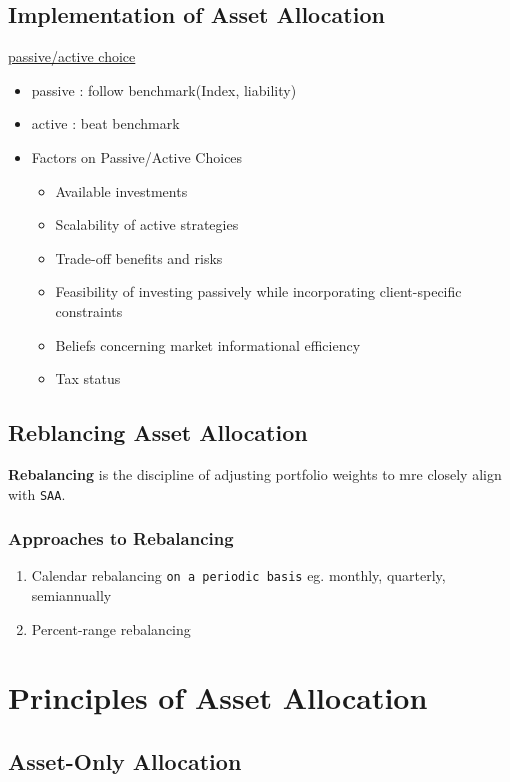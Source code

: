 \documentclass[12pt,a4paper]{article}
\begin{document}
\subsection{Implementation of Asset Allocation}
\label{sec:orgf552c2f}
\uline{passive/active choice}
\begin{itemize}
\item passive : follow benchmark(Index, liability)
\item active : beat benchmark

\item Factors on Passive/Active Choices
\begin{itemize}
\item Available investments
\item Scalability of active strategies
\item Trade-off benefits and risks
\item Feasibility of investing passively while incorporating client-specific constraints
\item Beliefs concerning market informational efficiency
\item Tax status
\end{itemize}
\end{itemize}
\subsection{Reblancing Asset Allocation}
\label{sec:org56a4bd5}
\textbf{Rebalancing} is the discipline of adjusting portfolio weights to mre closely align with \texttt{SAA}.
\subsubsection{Approaches to Rebalancing}
\label{sec:org61f9534}
\begin{enumerate}
\item Calendar rebalancing
\label{sec:org777d93e}
\texttt{on a periodic basis}
eg. monthly, quarterly, semiannually
\item Percent-range rebalancing
\label{sec:orgc6727c2}
\end{enumerate}
\section{Principles of Asset Allocation}
\label{sec:orgea8c978}
\subsection{Asset-Only Allocation}
\label{sec:orgd089649}
\end{document}
